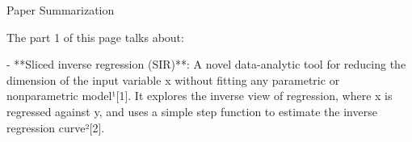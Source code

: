 \documentclass[UTF8,a4paper,10pt]{article}
\begin{document}


\pagebreak

  \begin{Problem}[]{}
  Paper Summarization
    
  \end{Problem}

  The part 1 of this page talks about:

- **Sliced inverse regression (SIR)**: A novel data-analytic tool for reducing the dimension of the input variable x without fitting any parametric or nonparametric model¹[1]. It explores the inverse view of regression, where x is regressed against y, and uses a simple step function to estimate the inverse regression curve²[2].
\end{document}

